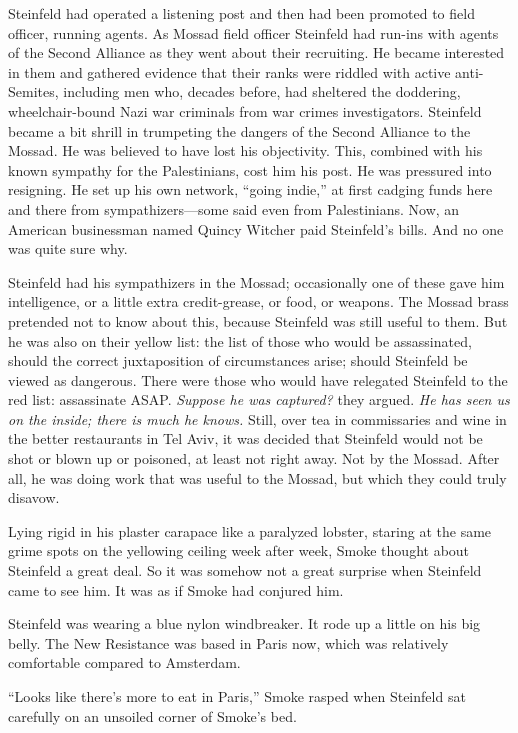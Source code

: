 Steinfeld had operated a listening post and then had been promoted to field officer, running agents. As Mossad field officer Steinfeld had run-ins with agents of the Second Alliance as they went about their recruiting. He became interested in them and gathered evidence that their ranks were riddled with active anti-Semites, including men who, decades before, had sheltered the doddering, wheelchair-bound Nazi war criminals from war crimes investigators. Steinfeld became a bit shrill in trumpeting the dangers of the Second Alliance to the Mossad. He was believed to have lost his objectivity. This, combined with his known sympathy for the Palestinians, cost him his post. He was pressured into resigning. He set up his own network, ``going indie,'' at first cadging funds here and there from sympathizers---some said even from Palestinians. Now, an American businessman named Quincy Witcher paid Steinfeld's bills. And no one was quite sure why.

Steinfeld had his sympathizers in the Mossad; occasionally one of these gave him intelligence, or a little extra credit-grease, or food, or weapons. The Mossad brass pretended not to know about this, because Steinfeld was still useful to them. But he was also on their yellow list: the list of those who would be assassinated, should the correct juxtaposition of circumstances arise; should Steinfeld be viewed as dangerous. There were those who would have relegated Steinfeld to the red list: assassinate ASAP. \textit{Suppose he was captured?} they argued. \textit{He has seen us on the inside; there is much he knows.} Still, over tea in commissaries and wine in the better restaurants in Tel Aviv, it was decided that Steinfeld would not be shot or blown up or poisoned, at least not right away. Not by the Mossad. After all, he was doing work that was useful to the Mossad, but which they could truly disavow.

Lying rigid in his plaster carapace like a paralyzed lobster, staring at the same grime spots on the yellowing ceiling week after week, Smoke thought about Steinfeld a great deal. So it was somehow not a great surprise when Steinfeld came to see him. It was as if Smoke had conjured him.

Steinfeld was wearing a blue nylon windbreaker. It rode up a little on his big belly. The New Resistance was based in Paris now, which was relatively comfortable compared to Amsterdam.

``Looks like there's more to eat in Paris,'' Smoke rasped when Steinfeld sat carefully on an unsoiled corner of Smoke's bed.

